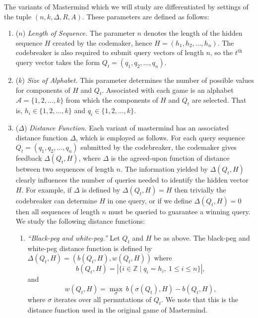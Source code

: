 \documentclass[12pt, a4paper]{article}
\newcommand{\Z}{\mathbb{Z}}           %
\newcommand{\nth}{^{\text{th}}}       %
\begin{document}
The variants of Mastermind which we will study are differentiated by settings of the tuple $(n, k, \Delta, R, A)$. These parameters are defined as follows:
\begin{enumerate}[label=(\roman*)]
	\item ($n$) \textit{Length of Sequence.} The parameter $n$ denotes the length of the hidden sequence $H$ created by the codemaker, hence $H = (h_1, h_2, \ldots, h_n)$. The codebreaker is also required to submit query vectors of length $n$, so the $t\nth$ query vector takes the form $Q_t = (q_1, q_2, \ldots, q_n)$.
	
	\item ($k$) \textit{Size of Alphabet.} This parameter determines the number of possible values for components of $H$ and $Q_t$. Associated with each game is an alphabet $\mathcal{A} = \{1,2,\ldots,k\}$ from which the components of $H$ and $Q_t$ are selected. That is, $h_i\in\{1,2,\ldots,k\}$ and $q_i\in\{1,2,\ldots,k\}$.
	
	\item($\Delta$) \textit{Distance Function.} Each variant of mastermind has an associated distance function $\Delta$, which is employed as follows. For each query sequence $Q_t = (q_1, q_2, \ldots, q_n)$ submitted by the codebreaker, the codemaker gives feedback $\Delta(Q_t, H)$, where $\Delta$ is the agreed-upon function of distance between two sequences of length $n$. The information yielded by $\Delta(Q_t, H)$ clearly influences the number of queries needed to identify the hidden vector $H$. For example, if $\Delta$ is defined by $\Delta(Q_t, H) = H$ then trivially the codebreaker can determine $H$ in one query, or if we define $\Delta(Q_t, H) = 0$ then all sequences of length $n$ must be queried to guarantee a winning query. We study the following distance functions:
	\begin{enumerate}[label=\alph*.]
		\item\textit{``Black-peg and white-peg.''} Let $Q_t$ and $H$ be as above. The black-peg and white-peg distance function is defined by $\Delta(Q_t, H) = (b(Q_t, H), w(Q_t, H))$ where
		\begin{equation}\label{blackHitsDefinition}
			b(Q_t, H) = \left|\{i\in\Z\mid q_i = h_i,~ 1\le i\le n\}\right|,
		\end{equation}
		and
		\begin{equation*}\label{whiteHitsDefinition}
			w(Q_t, H) = \max_{\sigma}~b(\sigma(Q_t), H) - b(Q_t, H),
		\end{equation*}
		where $\sigma$ iterates over all permutations of $Q_t$. We note that this is the distance function used in the original game of Mastermind.


\end{enumerate}
\end{enumerate}
\end{document}
